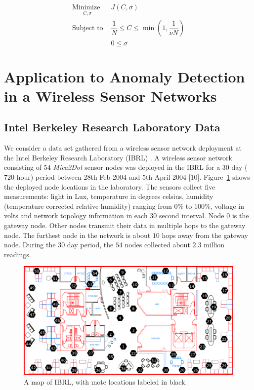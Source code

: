 \documentclass[3p,times]{elsarticle}
\begin{document}
\begin{subequations}
\begin{align}
\underset{
	\begin{array}{c}
		 C, \sigma
	\end{array}}{\text{Minimize }} & J\left( C, \sigma \right)\\
\text{Subject to } & \dfrac{1}{N} \le C \le \min \left( 1, \dfrac{1}{\nu N} \right) \\
& 0 \le \sigma
\end{align}
\end{subequations}

\section{Application to Anomaly Detection in a Wireless Sensor Networks}

\subsection{Intel Berkeley Research Laboratory Data}

We consider a data set gathered from a wireless sensor network deployment at the Intel Berkeley Research Laboratory (IBRL) \cite{Buonadonna2005}. A wireless sensor network consisting of $54$ \emph{Mica2Dot} sensor nodes was deployed in the IBRL for a $30$ day ($720$ hour) period between 28th Feb 2004 and 5th April 2004 [10]. Figure~\ref{fig:ibrl_wsn} shows the deployed node locations in the laboratory. The sensors collect five measurements: light in Lux, temperature in degrees celsius, humidity (temperature corrected relative humidity) ranging from $0\%$ to $100\%$, voltage in volts and network topology information in each $30$ second interval. Node $0$ is the gateway node. Other nodes transmit their data in multiple hops to the gateway node. The furthest node in the network is about $10$ hops away from the gateway node. During the $30$ day period, the $54$ nodes collected about $2.3$ million readings.

\begin{figure}[H]
\centering
\includegraphics[scale=.3]{Pictures/ibrl_wsn}
\caption{A map of IBRL, with mote locations labeled in black.}
\label{fig:ibrl_wsn}
\end{figure}
\end{document}
